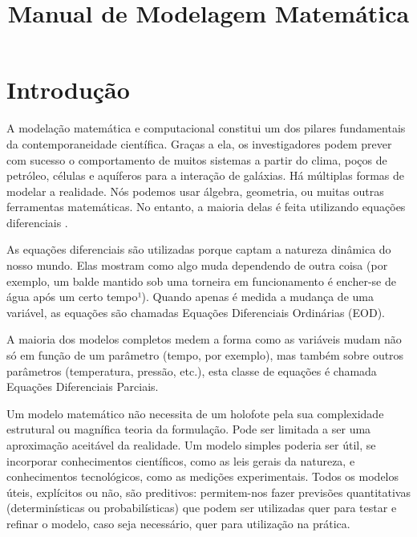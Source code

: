 \documentclass[11pt, letterpaper, portuguese]{article}
\begin{document}
\title{Manual de Modelagem Matemática}



\nocite{*}

\newpage

\tableofcontents

\newpage 

\section{Introdução}

\par{A modelação matemática e computacional constitui um dos pilares fundamentais da contemporaneidade científica. Graças a ela, os investigadores podem prever com sucesso o comportamento de muitos sistemas a partir do clima, poços de petróleo, células e aquíferos para a interação de galáxias. Há múltiplas formas de modelar a realidade. Nós podemos usar álgebra, geometria, ou muitas outras ferramentas matemáticas. No entanto, a maioria delas é feita utilizando equações diferenciais \cite{castillo_2012}.}

\par{As equações diferenciais são utilizadas porque captam a natureza dinâmica do nosso mundo. Elas mostram
como algo muda dependendo de outra coisa (por exemplo, um balde mantido sob uma torneira em funcionamento é encher-se de água após um certo tempo¹). Quando apenas é medida a mudança de uma variável, as equações são chamadas Equações Diferenciais Ordinárias (EOD).
}

\par{A maioria dos modelos completos medem a forma como as variáveis mudam não só em função de um parâmetro (tempo, por exemplo), mas também sobre outros parâmetros (temperatura, pressão, etc.), esta classe de equações é chamada
Equações Diferenciais Parciais.
}

\par{Um modelo matemático não necessita de um holofote pela sua complexidade estrutural ou magnífica teoria da formulação. Pode ser limitada a ser uma aproximação aceitável da realidade. Um modelo simples poderia ser útil, se incorporar conhecimentos científicos, como as leis gerais da natureza, e conhecimentos tecnológicos, como as medições experimentais. Todos os modelos úteis, explícitos ou não, são preditivos: permitem-nos fazer previsões quantitativas (determinísticas ou probabilísticas) que podem ser utilizadas quer para testar e refinar o modelo, caso seja necessário, quer para utilização na prática.}
\end{document}
